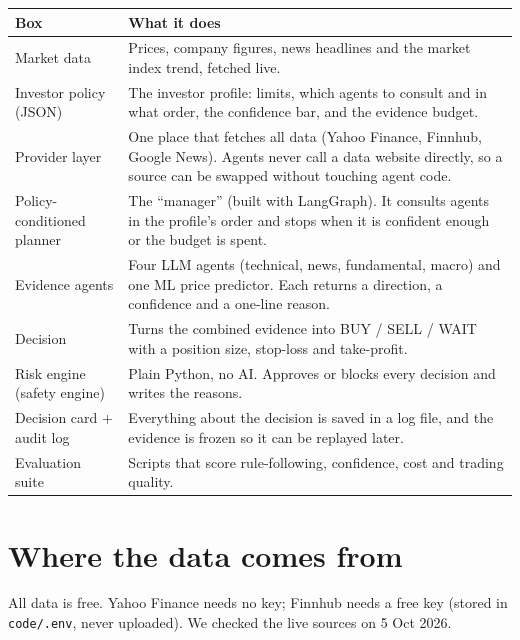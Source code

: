 \documentclass[10.5pt,a4paper]{article}
\newcommand{\file}[1]{\texttt{#1}}
\begin{document}
\begin{tabularx}{\linewidth}{L{3.4cm}Y}
\toprule
\textbf{Box} & \textbf{What it does} \\
\midrule
Market data & Prices, company figures, news headlines and the market index trend, fetched live. \\
Investor policy (JSON) & The investor profile: limits, which agents to consult and in what order, the confidence bar, and the evidence budget. \\
Provider layer & One place that fetches all data (Yahoo Finance, Finnhub, Google News). Agents never call a data website directly, so a source can be swapped without touching agent code. \\
Policy-conditioned planner & The ``manager'' (built with LangGraph). It consults agents in the profile's order and stops when it is confident enough or the budget is spent. \\
Evidence agents & Four LLM agents (technical, news, fundamental, macro) and one ML price predictor. Each returns a direction, a confidence and a one-line reason. \\
Decision & Turns the combined evidence into BUY / SELL / WAIT with a position size, stop-loss and take-profit. \\
Risk engine (safety engine) & Plain Python, no AI. Approves or blocks every decision and writes the reasons. \\
Decision card + audit log & Everything about the decision is saved in a log file, and the evidence is frozen so it can be replayed later. \\
Evaluation suite & Scripts that score rule-following, confidence, cost and trading quality. \\
\bottomrule
\end{tabularx}

\section{Where the data comes from}

All data is free. Yahoo Finance needs no key; Finnhub needs a free key (stored in \file{code/.env}, never uploaded). We checked the live sources on 5 Oct 2026.
\end{document}
